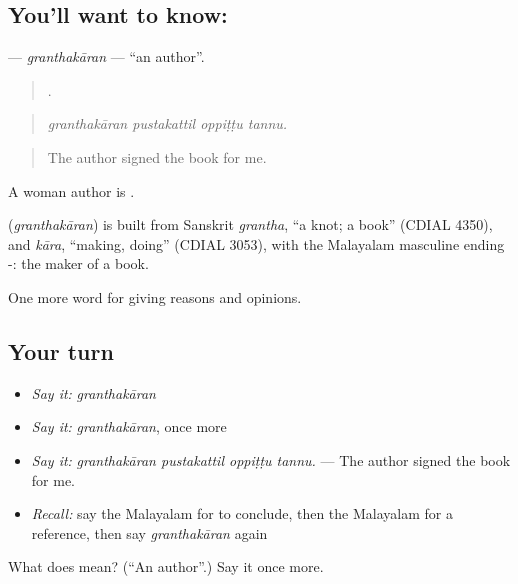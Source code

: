 \subsection*{You'll want to know: }
\textbf{} — \emph{granthakāran} — \textquotedblleft{}an author\textquotedblright{}.

\begin{quote}
   .
\end{quote}

\begin{quote}
\emph{granthakāran pustakattil oppiṭṭu tannu.}
\end{quote}

\begin{quote}
The author signed the book for me.
\end{quote}

A woman author is .

\begin{cousinweb}
\textbf{} (\emph{granthakāran}) is built from Sanskrit \emph{grantha}, \textquotedblleft{}a knot; a book\textquotedblright{} (CDIAL 4350), and \emph{kāra}, \textquotedblleft{}making, doing\textquotedblright{} (CDIAL 3053), with the Malayalam masculine ending -: the maker of a book.
\end{cousinweb}

\begin{grammarlens}[title={What you've built}]
One more word for giving reasons and opinions.
\end{grammarlens}

\subsection*{Your turn}
\begin{itemize}
\raggedright
  \item \emph{Say it:} \emph{granthakāran}
  \item \emph{Say it:} \emph{granthakāran}, once more
  \item \emph{Say it:} \emph{granthakāran pustakattil oppiṭṭu tannu.} — The author signed the book for me.
  \item \emph{Recall:} say the Malayalam for to conclude, then the Malayalam for a reference, then say \emph{granthakāran} again
\end{itemize}

\begin{tcolorbox}[breakable,colback=teal!4,colframe=teal!35!black,title={Before you move on}]
What does  mean? (\textquotedblleft{}An author\textquotedblright{}.) Say it once more.
\end{tcolorbox}
